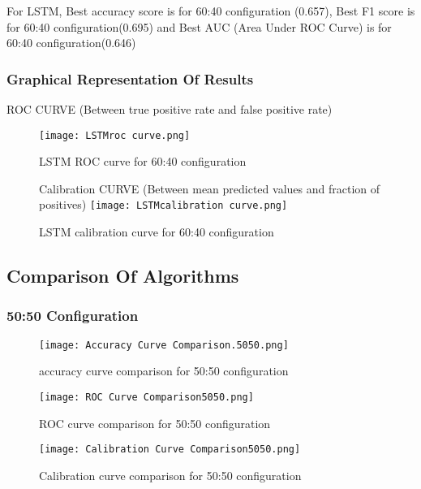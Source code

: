 \documentclass{article}
\begin{document}
For LSTM,
Best accuracy score is for 60:40 configuration (0.657),
Best F1 score is for 60:40 configuration(0.695) and
Best AUC (Area Under ROC Curve) is for 60:40 configuration(0.646)
\newpage
\subsubsection {Graphical Representation Of Results}
ROC CURVE (Between true positive rate and false positive rate)
\begin{figure}[h!]
\centering
\texttt{[image: LSTMroc curve.png]}
\caption {LSTM ROC curve for 60:40 configuration}
\label{fig-name}
\end{figure}

\begin{figure}[h!]

\centering
Calibration CURVE (Between mean predicted values and fraction of positives)
\texttt{[image: LSTMcalibration curve.png]}
\caption {LSTM calibration curve for 60:40 configuration}
\label{fig-name}
\end{figure}


\newpage
\subsection{Comparison Of Algorithms}

\subsubsection{50:50 Configuration}

\begin{figure}[H]
\centering
\texttt{[image: Accuracy Curve Comparison.5050.png]}
\caption {accuracy curve comparison for 50:50 configuration}
\label{fig-name}
\end{figure}


\begin{figure}[H]
\centering
\texttt{[image: ROC Curve Comparison5050.png]}
\caption {ROC curve comparison for 50:50 configuration}
\label{fig-name}
\end{figure}
\begin{figure}[H]
\centering
\texttt{[image: Calibration Curve Comparison5050.png]}
\caption {Calibration curve comparison for 50:50 configuration}
\label{fig-name}
\end{figure}
\end{document}
